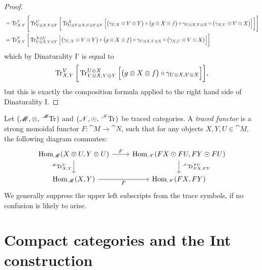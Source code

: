 \documentclass[12pt,oneside,article,draft]{memoir}
\begin{document}
\begin{proof}
{\begin{align*}
  &=\operatorname{Tr}^V_{X,Y}\Bigg[\operatorname{Tr}^U_{V\otimes X,V\otimes Y}\bigg[\operatorname{Tr}^X_{U\otimes V\otimes X,U\otimes V\otimes Y}\Big[\big(\gamma_{U,X}\otimes V\otimes Y\big)\circ\big(g\otimes X\otimes f\big)\circ\gamma_{U\otimes X, V\otimes X}\circ\big(\gamma_{X,U}\otimes V\otimes X\big)\Big]\bigg]\Bigg]\\
  &=\operatorname{Tr}^V_{X,Y}\bigg[\operatorname{Tr}^{X\otimes U}_{V\otimes X,V\otimes Y}\Big[\big(\gamma_{U,X}\otimes V\otimes Y\big)\circ\big(g\otimes X\otimes f\big)\circ\gamma_{U\otimes X, V\otimes X}\circ\big(\gamma_{X,U}\otimes V\otimes X\big)\Big]\bigg]
 \end{align*}
 which by Dinaturality I' is equal to
 \[\operatorname{Tr}^V_{X,Y}\bigg[\operatorname{Tr}^{U\otimes X}_{V\otimes X,V\otimes Y}\Big[\big(g\otimes X\otimes f\big)\circ\gamma_{U\otimes X, V\otimes X}\Big]\bigg],\]
 but this is exactly the composition formula applied to the right hand side of Dinaturality I.}%
\end{proof}

\begin{definition}

Let $(\cat{M},\otimes,\tensor*[^{\cat{M}}]{\Tr}{})$ and $(\cat{N},\odot,\tensor*[^{\cat{N}}]{\Tr}{})$ be traced categories. A \emph{traced functor} is a strong monoidal functor $F\colon\cat{M}\to\cat{N}$, such that for any objects $X,Y,U\in\cat{M}$, the following diagram commutes:
$$
\begin{tikzcd}
	\Hom_{\cat{M}}(X\otimes U,Y\otimes U)
		\rar{F}
		\dar[swap]{\tensor*[^{\cat{M}}]{\Tr}{^U_{X,Y}}}
	& \Hom_{\cat{N}}(FX\odot FU,FY\odot FU)
		\dar{\tensor*[^{\cat{N}}]{\Tr}{^{FU}_{FX,FY}}} \\
	\Hom_{\cat{M}}(X,Y)
		\rar[swap]{F}
	& \Hom_{\cat{N}}(FX,FY)
\end{tikzcd}
$$
We generally suppress the upper left subscripts from the trace symbols, if no confusion is likely to arise.

\end{definition}

\section{Compact categories and the Int construction}
\end{document}

